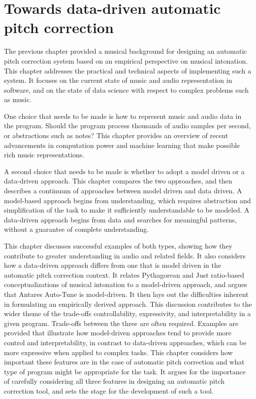 \chapter{Towards data-driven automatic pitch correction}
\label{chap:tech-background}
The previous chapter provided a musical background for designing an automatic pitch correction system based on an empirical perspective on musical intonation. This chapter addresses the practical and technical aspects of implementing such a system. It focuses on the current state of music and audio representation in software, and on the state of data science with respect to complex problems such as music. 

One choice that needs to be made is how to represent music and audio data in the program. Should the program process thousands of audio samples per second, or abstractions such as notes? This chapter provides an overview of recent advancements in computation power and machine learning that make possible rich music representations. 

A second choice that needs to be made is whether to adopt a model driven or a data-driven approach. This chapter compares the two approaches, and then describes a continuum of approaches between model driven and data driven. A model-based approach begins from understanding, which requires abstraction and simplification of the task to make it sufficiently understandable to be modeled. A data-driven approach begins from data and searches for meaningful patterns, without a guarantee of complete understanding. 

This chapter discusses successful examples of both types, showing how they contribute to greater understanding in audio and related fields. It also considers how a data-driven approach differs from one that is model driven in the automatic pitch correction context. It relates Pythagorean and Just ratio-based conceptualizations of musical intonation to a model-driven approach, and argues that Antares Auto-Tune is model-driven. It then lays out the difficulties inherent in formulating an empirically derived approach. This discussion contributes to the wider theme of the trade-offs controllability, expressivity, and interpretability in a given program. Trade-offs between the three are often required. Examples are provided that illustrate how model-driven approaches tend to provide more control and interpretability, in contrast to data-driven approaches, which can be more expressive when applied to complex tasks. This chapter considers how important these features are in the case of automatic pitch correction and what type of program might be appropriate for the task. It argues for the importance of carefully considering all three features in designing an automatic pitch correction tool, and sets the stage for the development of such a tool. 


